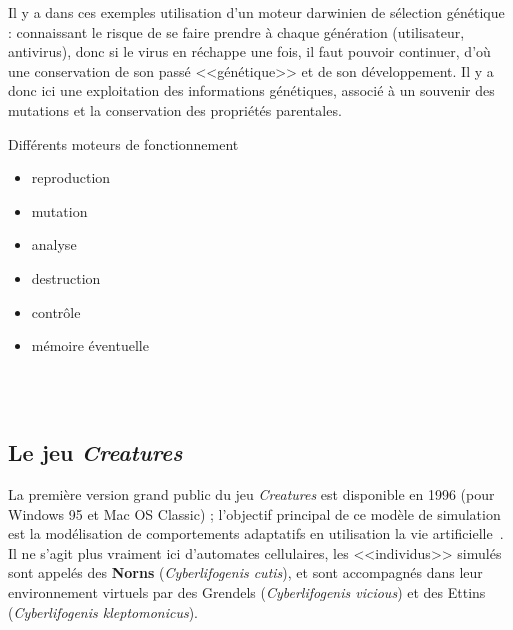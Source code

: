 \documentclass[11pt,twoside,a4paper]{article}
\begin{document}
\begin{minipage}{0.6\linewidth}
Il y a dans ces exemples utilisation d'un moteur darwinien de s{\'e}lection g{\'e}n{\'e}tique : connaissant le risque de se faire prendre {\`a} chaque g{\'e}n{\'e}ration (utilisateur, antivirus), donc si le virus en r{\'e}chappe une fois, il faut pouvoir continuer, d'o{\`u} une conservation de son pass{\'e} <<g{\'e}n{\'e}tique>> et de son d{\'e}veloppement. Il y a donc ici une exploitation des informations g{\'e}n{\'e}tiques, associ{\'e} {\`a} un souvenir des mutations et la conservation des propri{\'e}t{\'e}s parentales.
\end{minipage}
\begin{minipage}{0.1\linewidth}\end{minipage}
\begin{minipage}{0.3\linewidth}
Diff{\'e}rents moteurs de fonctionnement
\begin{itemize}
	\item reproduction
	\item mutation
	\item analyse
	\item destruction
	\item contr{\^o}le
	\item m{\'e}moire {\'e}ventuelle
\end{itemize}
\end{minipage}~\\~\\

\subsection{Le jeu \textit{Creatures}}

La premi{\`e}re version grand public du jeu \textit{Creatures} est disponible en 1996 (pour Windows 95 et Mac OS Classic) ; l'objectif principal de ce mod{\`e}le de simulation est la mod{\'e}lisation de comportements adaptatifs en utilisation la vie artificielle~\cite{CliGra99,GraCli97,GraCli98,GrClMa96,GrClMa97}. Il ne s'agit plus vraiment ici d'automates cellulaires, les <<individus>> simul{\'e}s sont appel{\'e}s des \textbf{Norns} (\textit{Cyberlifogenis cutis}), et sont accompagn{\'e}s dans leur environnement virtuels par des Grendels (\textit{Cyberlifogenis vicious}) et des Ettins (\textit{Cyberlifogenis kleptomonicus}).~\\

\end{document}
